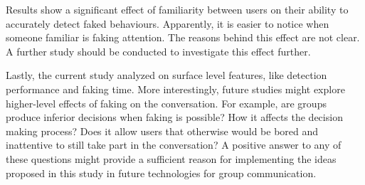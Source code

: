 \documentclass[]{simple-thesis}
\begin{document}
Results show a significant effect of familiarity between users on their ability to accurately detect faked behaviours.
Apparently, it is easier to notice when someone familiar is faking attention.
The reasons behind this effect are not clear.
A further study should be conducted to investigate this effect further.

Lastly, the current study analyzed on surface level features, like detection performance and faking time.
More interestingly, future studies might explore higher-level effects of faking on the conversation.
For example, are groups produce inferior decisions when faking is possible?
How it affects the decision making process?
Does it allow users that otherwise would be bored and inattentive to still take part in the conversation?
A positive answer to any of these questions might provide a sufficient reason for implementing the ideas proposed in this study in future technologies for group communication.


\cleardoublepage
{}
{}


\end{document}
